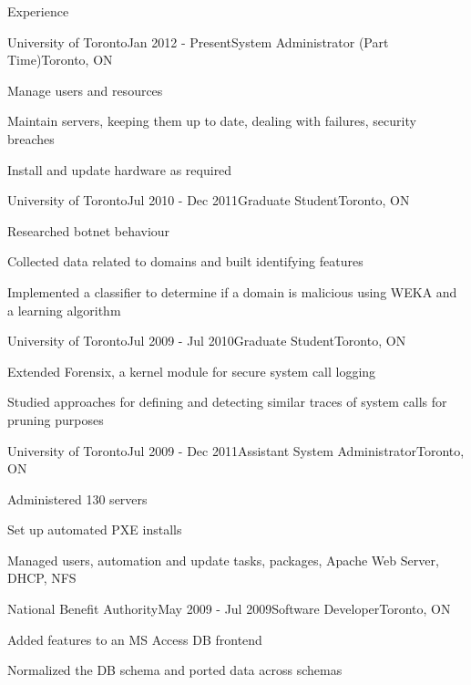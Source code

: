 \documentclass{resume}
\begin{document}
\begin{rSection}{Experience}
    \begin{rSubsection}{University of Toronto}{Jan 2012 - Present}{System Administrator (Part Time)}{Toronto, ON}
      \item Manage users and resources
      \item Maintain servers, keeping them up to date, dealing with failures, security breaches
      \item Install and update hardware as required
    \end{rSubsection}

    \begin{rSubsection}{University of Toronto}{Jul 2010 - Dec 2011}{Graduate Student}{Toronto, ON}
      \item Researched botnet behaviour
      \item Collected data related to domains and built identifying features
      \item Implemented a classifier to determine if a domain is malicious using WEKA and a learning algorithm
    \end{rSubsection}

    \begin{rSubsection}{University of Toronto}{Jul 2009 - Jul 2010}{Graduate Student}{Toronto, ON}
      \item Extended Forensix, a kernel module for secure system call logging
      \item Studied approaches for defining and detecting similar traces of system calls for pruning purposes
    \end{rSubsection}

    \begin{rSubsection}{University of Toronto}{Jul 2009 - Dec 2011}{Assistant System Administrator}{Toronto, ON}
      \item Administered 130 servers
      \item Set up automated PXE installs
      \item Managed users, automation and update tasks, packages, Apache Web Server, DHCP, NFS
    \end{rSubsection}

    \begin{rSubsection}{National Benefit Authority}{May 2009 - Jul 2009}{Software Developer}{Toronto, ON}
      \item Added features to an MS Access DB frontend
      \item Normalized the DB schema and ported data across schemas
    \end{rSubsection}


\end{rSection}
\end{document}
